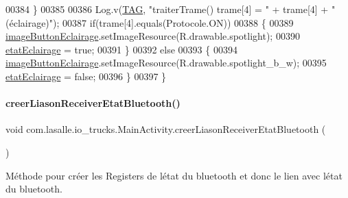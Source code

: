 \begin{DoxyCode}
00384         \}
00385 
00386         Log.v(\hyperlink{classcom_1_1lasalle_1_1io__trucks_1_1_main_activity_a37b90dba972711328e3f4c83c55eb0fc}{TAG}, \textcolor{stringliteral}{"traiterTrame() trame[4] = "} + trame[4] + \textcolor{stringliteral}{" (éclairage)"});
00387         \textcolor{keywordflow}{if}(trame[4].equals(Protocole.ON))
00388         \{
00389             \hyperlink{classcom_1_1lasalle_1_1io__trucks_1_1_main_activity_a1cc3f48aebca6c187b2a964fa6f569fc}{imageButtonEclairage}.setImageResource(R.drawable.spotlight);
00390             \hyperlink{classcom_1_1lasalle_1_1io__trucks_1_1_main_activity_a345177f9fe1d73a402a57ce992a5aa1a}{etatEclairage} = \textcolor{keyword}{true};
00391         \}
00392         \textcolor{keywordflow}{else}
00393         \{
00394             \hyperlink{classcom_1_1lasalle_1_1io__trucks_1_1_main_activity_a1cc3f48aebca6c187b2a964fa6f569fc}{imageButtonEclairage}.setImageResource(R.drawable.spotlight\_b\_w);
00395             \hyperlink{classcom_1_1lasalle_1_1io__trucks_1_1_main_activity_a345177f9fe1d73a402a57ce992a5aa1a}{etatEclairage} = \textcolor{keyword}{false};
00396         \}
00397     \}
\end{DoxyCode}
\mbox{\label{classcom_1_1lasalle_1_1io__trucks_1_1_main_activity_a14d1db05fdfec7536d6b7c9809e360a0}} 
\paragraph{\texorpdfstring{creer\+Liason\+Receiver\+Etat\+Bluetooth()}{creerLiasonReceiverEtatBluetooth()}}
{\footnotesize\ttfamily void com.\+lasalle.\+io\+\_\+trucks.\+Main\+Activity.\+creer\+Liason\+Receiver\+Etat\+Bluetooth (\begin{DoxyParamCaption}{ }\end{DoxyParamCaption})\hspace{0.3cm}{\ttfamily [private]}}



Méthode pour créer les Registers de l\textquotesingle{}état du bluetooth et donc le lien avec l\textquotesingle{}état du bluetooth. 



